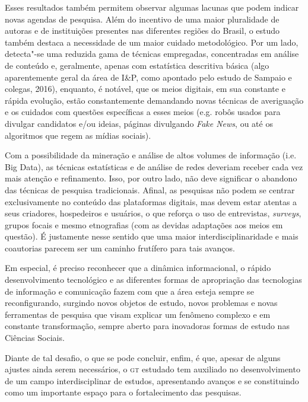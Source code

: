 Esses resultados também permitem observar algumas lacunas que podem
indicar novas agendas de pesquisa. Além do incentivo de uma maior
pluralidade de autoras e de instituições presentes nas diferentes
regiões do Brasil, o estudo também destaca a necessidade de um maior
cuidado metodológico. Por um lado, detecta"-se uma reduzida gama de
técnicas empregadas, concentradas em análise de conteúdo e, geralmente,
apenas com estatística descritiva básica (algo aparentemente geral da
área de I\&P, como apontado pelo estudo de Sampaio e colegas, 2016),
enquanto, é notável, que os meios digitais, em sua constante e rápida
evolução, estão constantemente demandando novas técnicas de averiguação
e os cuidados com questões específicas a esses meios (e.g. robôs usados
para divulgar candidatos e/ou ideias, páginas divulgando \emph{Fake
News}, ou até os algoritmos que regem as mídias sociais).

Com a possibilidade da mineração e análise de altos volumes de
informação (i.e. Big Data), as técnicas estatísticas e de análise de
redes deveriam receber cada vez mais atenção e refinamento. Isso, por
outro lado, não deve significar o abandono das técnicas de pesquisa
tradicionais. Afinal, as pesquisas não podem se centrar exclusivamente
no conteúdo das plataformas digitais, mas devem estar atentas a seus
criadores, hospedeiros e usuários, o que reforça o uso de entrevistas,
\emph{surveys}, grupos focais e mesmo etnografias (com as devidas
adaptações aos meios em questão). É justamente nesse sentido que uma
maior interdisciplinaridade e mais coautorias parecem ser um caminho
frutífero para tais avanços.

Em especial, é preciso reconhecer que a dinâmica informacional, o rápido
desenvolvimento tecnológico e as diferentes formas de apropriação das
tecnologias de informação e comunicação fazem com que a área esteja
sempre se reconfigurando, surgindo novos objetos de estudo, novos
problemas e novas ferramentas de pesquisa que visam explicar um fenômeno
complexo e em constante transformação, sempre aberto para inovadoras
formas de estudo nas Ciências Sociais.

Diante de tal desafio, o que se pode concluir, enfim, é que, apesar de
alguns ajustes ainda serem necessários, o \textsc{gt} estudado tem auxiliado no
desenvolvimento de um campo interdisciplinar de estudos, apresentando
avanços e se constituindo como um importante espaço para o
fortalecimento das pesquisas.

